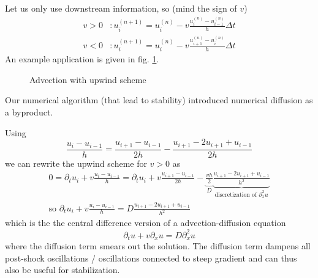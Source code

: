 Let us only use downstream information, so (mind the sign of $v$)
\begin{equation}
    \begin{aligned}
        v > 0&: u_i^{(n+1)} = u_i^{(n)} - v \frac{u_i^{(n)} - u_{i-1}^{(n)}}{h} \Delta t  \\
        v < 0&: u_i^{(n+1)} = u_i^{(n)} - v \frac{u_{i+1}^{(n)} - u_{i}^{(n)}}{h} \Delta t 
    \end{aligned}
\end{equation}
An example application is given in fig. \ref{fig:advection_upwind}.

\begin{figure}[htb!]
    \centering
    
    \caption{Advection with upwind scheme}
    \label{fig:advection_upwind}
\end{figure}


Our numerical algorithm (that lead to stability) introduced numerical diffusion as a byproduct.

Using
\begin{equation}
    \frac{u_i - u_{i-1}}{h} = \frac{u_{i + 1} - u_{i-1}}{2h} - \frac{u_{i + 1} - 2u_{i + 1} + u_{i-1}}{2h}
\end{equation}
we can rewrite the upwind scheme for $v > 0$ as
\begin{equation}
    \begin{gathered}
        0 = \partial_t u_i + v \frac{u_i - u_{i-1}}{h} = \partial_t u_i + v \frac{u_{i + 1} - u_{i-1}}{2h} - \underbrace{\frac{vh}{2}}_{D} \underbrace{\frac{u_{i + 1} - 2u_{i + 1} + u_{i-1}}{h^2}}_{\text{discretization of } \partial_x^2 u} \\
        \text{so } \partial_t u_i + v \frac{u_i - u_{i-1}}{h} = D \frac{u_{i + 1} - 2u_{i + 1} + u_{i-1}}{h^2}
    \end{gathered}
\end{equation}
which is the \textcolor{blue1}{the central difference version of a advection-diffusion equation}
\begin{equation}
    \partial_t u + v \partial_x u = D \partial_x^2 u
\end{equation}
where the diffusion term smears out the solution.
The diffusion term dampens all post-shock oscillations / oscillations connected to steep gradient
and can thus also be useful for stabilization.

